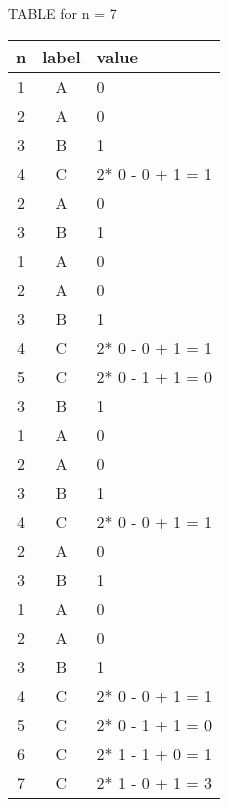 \documentclass[a4paper]{article}
\begin{document}
TABLE for n = 7

\begin{tabular}{|c|c|l|}
\hline
n & label & value \\
\hline
1  & A & 0 \\
2  & A & 0 \\
3  & B & 1 \\
4  & C & 2* 0 - 0 + 1 = 1 \\
2  & A & 0 \\
3  & B & 1 \\
1  & A & 0 \\
2  & A & 0 \\
3  & B & 1 \\
4  & C & 2* 0 - 0 + 1 = 1 \\
5  & C & 2* 0 - 1 + 1 = 0 \\
3  & B & 1 \\
1  & A & 0 \\
2  & A & 0 \\
3  & B & 1 \\
4  & C & 2* 0 - 0 + 1 = 1 \\
2  & A & 0 \\
3  & B & 1 \\
1  & A & 0 \\
2  & A & 0 \\
3  & B & 1 \\
4  & C & 2* 0 - 0 + 1 = 1 \\
5  & C & 2* 0 - 1 + 1 = 0 \\
6  & C & 2* 1 - 1 + 0 = 1 \\
7  & C & 2* 1 - 0 + 1 = 3 \\
\hline
\end{tabular}
\end{document}
